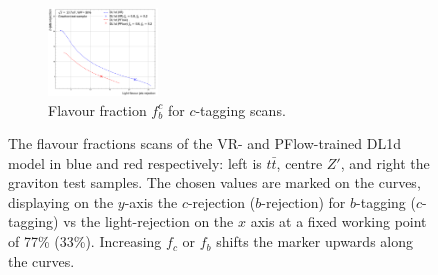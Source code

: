 \begin{figure}[h!]
\begin{subfigure}[b]{\textwidth}
    \includegraphics[width=0.32\textwidth]{Images/FTAG/VRDL1d/scansfraction/thesis_plot_frac_c/cf_graviton_2000.png}
    \caption{Flavour fraction $f_b^c$ for $c$-tagging scans.} 
    \label{fig:DL1dVRscanfc}
\end{subfigure}
  \caption{The flavour fractions scans of the VR- and PFlow-trained DL1d model in blue and red respectively: left is $t\bar{t}$, centre $Z'$, and right the graviton test samples. The chosen values are marked on the curves, displaying on the $y$-axis the $c$-rejection ($b$-rejection) for $b$-tagging ($c$-tagging) vs the light-rejection on the $x$ axis at a fixed working point of 77\% (33\%). Increasing $f_c$ or $f_b$ shifts the marker upwards along the curves. }
  \label{apfig:DL1dVRscanf}
\end{figure} 
\vspace*{\fill}

\clearpage

